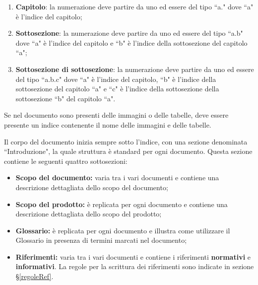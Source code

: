                     \begin{enumerate}
                        \item \textbf{Capitolo}: la numerazione deve partire da uno ed essere del tipo
                        ``a." dove ``a" è l'indice del capitolo;
                        \item \textbf{Sottosezione}: la numerazione deve partire da uno ed essere del
                        tipo ``a.b" dove ``a" è l'indice del capitolo e ``b" è l'indice della sottosezione
                        del capitolo ``a";
                        \item \textbf{Sottosezione di sottosezione}: la numerazione deve partire da uno ed
                        essere del tipo ``a.b.c" dove ``a" è l'indice del capitolo, ``b" è l'indice della
                        sottosezione del capitolo ``a" e ``c" è l'indice della sottosezione della
                        sottosezione ``b" del capitolo ``a".
                    \end{enumerate}

				Se nel documento sono presenti delle immagini o delle tabelle, deve essere presente un indice contenente
				il nome delle immagini e delle tabelle.
				
			
				Il corpo del documento inizia sempre sotto l'indice, con una sezione denominata ``Introduzione", la quale struttura è
				standard per ogni documento. Questa sezione contiene le seguenti quattro sottosezioni:
				
					\begin{itemize}
						\item \textbf{Scopo del documento:} varia tra i vari documenti e contiene una descrizione dettagliata dello scopo
						del documento;
						\item \textbf{Scopo del prodotto:} è replicata per ogni documento e contiene una descrizione dettagliata dello
						scopo del prodotto;
						\item \textbf{Glossario:} è replicata per ogni documento e illustra come utilizzare il Glossario in presenza di
						termini marcati nel documento;
						\item \textbf{Riferimenti:} varia tra i vari documenti e contiene i riferimenti \textbf{normativi} e 
						\textbf{informativi}. La regole per la scrittura dei riferimenti sono indicate in sezione §\ref{regoleRef}.
					\end{itemize}

